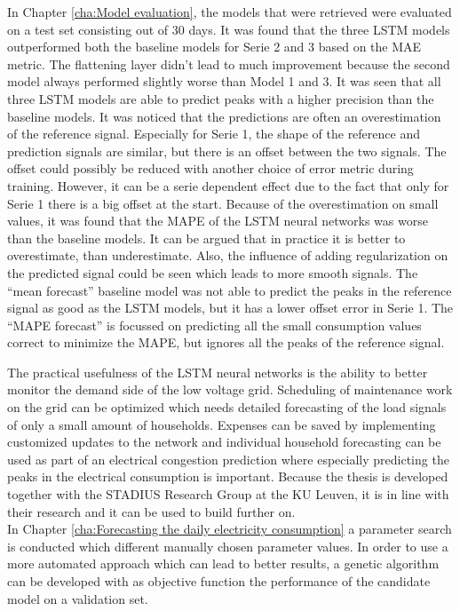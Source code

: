 In Chapter \ref{cha:Model evaluation}, the models that were retrieved were evaluated on a test set consisting out of 30 days. It was found that the three LSTM models outperformed both the baseline models for Serie 2 and 3 based on the MAE metric. The flattening layer didn't lead to much improvement because the second model always performed slightly worse than Model 1 and 3. It was seen that all three LSTM models are able to predict peaks with a higher precision than the baseline models. It was noticed that the predictions are often an overestimation of the reference signal. Especially for Serie 1, the shape of the reference and prediction signals are similar, but there is an offset between the two signals. The offset could possibly be reduced with another choice of error metric during training. However, it can be a serie dependent effect due to the fact that only for Serie 1 there is a big offset at the start. Because of the overestimation on small values, it was found that the MAPE of the LSTM neural networks was worse than the baseline models. It can be argued that in practice it is better to overestimate, than underestimate. Also, the influence of adding regularization on the predicted signal could be seen which leads to more smooth signals. The ``mean forecast'' baseline model was not able to predict the peaks in the reference signal as good as the LSTM models, but it has a lower offset error in Serie 1. The ``MAPE forecast'' is focussed on predicting all the small consumption values correct to minimize the MAPE, but ignores all the peaks of the reference signal.

The practical usefulness of the LSTM neural networks is the ability to better monitor the demand side of the low voltage grid. Scheduling of maintenance work on the grid can be optimized which needs detailed forecasting of the load signals of only a small amount of households. Expenses can be saved by implementing customized updates to the network and individual household forecasting can be used as part of an electrical congestion prediction where especially predicting the peaks in the electrical consumption is important. Because the thesis is developed together with the STADIUS Research Group at the KU Leuven, it is in line with their research and it can be used to build further on.\\


In Chapter \ref{cha:Forecasting the daily electricity consumption} a parameter search is conducted which different manually chosen parameter values. In order to use a more automated approach which can lead to better results, a genetic algorithm can be developed with as objective function the performance of the candidate model on a validation set.\\



